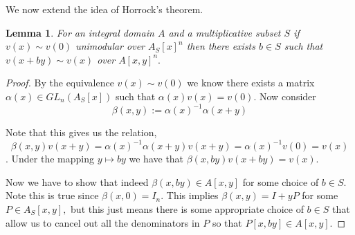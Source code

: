 \documentclass[12pt]{report}
\numberwithin{equation}{section}
\newcounter{dummy} \numberwithin{dummy}{section}
\newtheorem{lemma}[dummy]{Lemma}
\begin{document}
	We now extend the idea of Horrock's theorem.
	
	\begin{lemma}\label{horrocksbutforlocal}
		For an integral domain $A$ and a multiplicative subset $S$ if $v(x) \sim v(0)$ unimodular over $A_S[x]^n $ then there exists $b \in S$ such that \\$v(x+by) \sim v(x) $ over $A[x,y]^n.$
	\end{lemma}
	\begin{proof}
		By the equivalence $v(x) \sim v(0)$ we know there exists a matrix $\alpha (x) \in GL_n(A_S[x])$ such that $\alpha(x)v(x)=v(0) $. Now consider \[ \beta(x,y) := \alpha(x)^{-1} \alpha(x+y) \]
		
		Note that this gives us the relation, $$\beta(x,y)v(x+y)=\alpha(x)^{-1}\alpha(x+y) v(x+y)=\alpha(x)^{-1}v(0)=v(x)$$. Under the mapping $y \mapsto by$ we have that $\beta(x,by)v(x+by)=v(x).$
		
		Now we have to show that indeed $\beta(x,by)\in A[x,y]$ for some choice of $b \in S$. Note this is true since $\beta(x,0)=I_n $. This implies $\beta(x,y)=I+yP $ for some $P \in A_S[x,y],$ but this just means there is some appropriate choice of $b \in S$ that allow us to cancel out all the denominators in $P$ so that $P[x,by] \in A[x,y]$.
	\end{proof}
	
\end{document}
